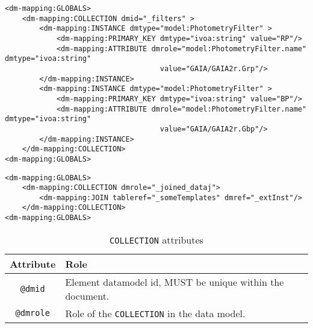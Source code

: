 \begin{lstlisting}[frame=single,caption={Example of \texttt{COLLECTION} child of GLOBALS},style=XML,basicstyle=\tiny]
<dm-mapping:GLOBALS>
    <dm-mapping:COLLECTION dmid="_filters" >
        <dm-mapping:INSTANCE dmtype="model:PhotometryFilter" >
            <dm-mapping:PRIMARY_KEY dmtype="ivoa:string" value="RP"/>
            <dm-mapping:ATTRIBUTE dmrole="model:PhotometryFilter.name" dmtype="ivoa:string"
                                    value="GAIA/GAIA2r.Grp"/>
        </dm-mapping:INSTANCE>
        <dm-mapping:INSTANCE dmtype="model:PhotometryFilter" >
            <dm-mapping:PRIMARY_KEY dmtype="ivoa:string" value="BP"/>
            <dm-mapping:ATTRIBUTE dmrole="model:PhotometryFilter.name" dmtype="ivoa:string"
                                    value="GAIA/GAIA2r.Gbp"/>
        </dm-mapping:INSTANCE>
    </dm-mapping:COLLECTION>
<dm-mapping:GLOBALS>
\end{lstlisting}   

\begin{lstlisting}[frame=single,caption={Example of \texttt{COLLECTION} populated with a JOIN},style=XML,basicstyle=\tiny]
<dm-mapping:GLOBALS>
    <dm-mapping:COLLECTION dmrole="_joined_dataj">
        <dm-mapping:JOIN tableref="_someTemplates" dmref="_extInst"/>
    </dm-mapping:COLLECTION>
<dm-mapping:GLOBALS>
\end{lstlisting}   


\begin{table}[!htbp]
  \small
  \centering
  \begin{tabulary}{\linewidth}{|c|J|}       
    \hline 
         \textbf{Attribute} & 
         \textbf {Role}\\
    \hline
    \hline  
         \texttt{@dmid} & 
         Element datamodel id, MUST be unique within the document.\\
    \hline 
         \texttt{@dmrole} & 
         Role of the \texttt{COLLECTION} in the data model. \\
    \hline 
  \end{tabulary}
  \caption{\texttt{COLLECTION} attributes} 
  \label{tbl:collection-att}
 \end{table}

